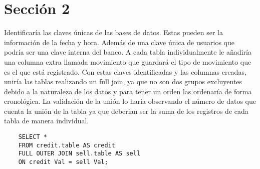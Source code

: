 \documentclass[../main.tex]{subfiles}
\begin{document}
\section*{Sección 2}
Identificaría las claves únicas de las bases de datos. Estas pueden ser la información de la fecha y hora. Además de una clave única de usuarios que podría ser una clave interna del banco. A cada tabla individualmente le añadiría una columna extra llamada movimiento que guardará el tipo de movimiento que es el que está registrado. Con estas claves identificadas  y las columnas creadas, uniría las tablas realizando un full join, ya que no son dos grupos excluyentes debido a la naturaleza de los datos y para tener un orden las ordenaría de forma cronológica. La validación de la unión lo haria observando el número de datos que cuenta la unión de la tabla ya que deberian ser la suma de los registros de cada tabla de manera individual.
\begin{verbatim}
    SELECT *
    FROM credit.table AS credit
    FULL OUTER JOIN sell.table AS sell
    ON credit Val = sell Val;
\end{verbatim}
\end{document}
